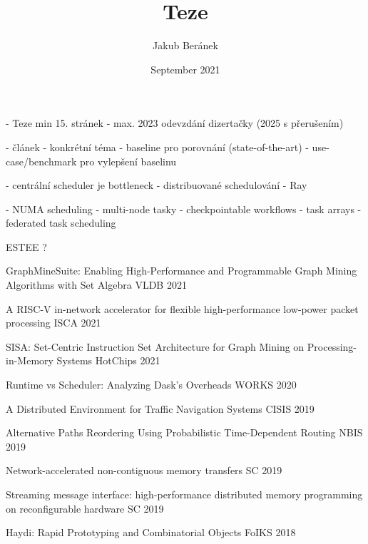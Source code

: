\documentclass{article}
\title{Teze}
\author{Jakub Beránek}
\date{September 2021}
\begin{document}
\maketitle

- Teze min 15. stránek
- max. 2023 odevzdání dizertačky (2025 s přerušením)

- článek
- konkrétní téma
- baseline pro porovnání (state-of-the-art)
- use-case/benchmark pro vylepšení baselinu

- centrální scheduler je bottleneck
- distribuované schedulování - Ray

- NUMA scheduling
- multi-node tasky
- checkpointable workflows
- task arrays
- federated task scheduling

ESTEE
?

GraphMineSuite: Enabling High-Performance and Programmable Graph Mining Algorithms with Set Algebra
VLDB 2021

A RISC-V in-network accelerator for flexible high-performance low-power packet processing
ISCA 2021

SISA: Set-Centric Instruction Set Architecture for Graph Mining on Processing-in-Memory Systems
HotChips 2021

Runtime vs Scheduler: Analyzing Dask's Overheads
WORKS 2020

A Distributed Environment for Traffic Navigation Systems
CISIS 2019

Alternative Paths Reordering Using Probabilistic Time-Dependent Routing
NBIS 2019

Network-accelerated non-contiguous memory transfers
SC 2019

Streaming message interface: high-performance distributed memory programming on reconfigurable hardware
SC 2019

Haydi: Rapid Prototyping and Combinatorial Objects
FoIKS 2018

\end{document}
